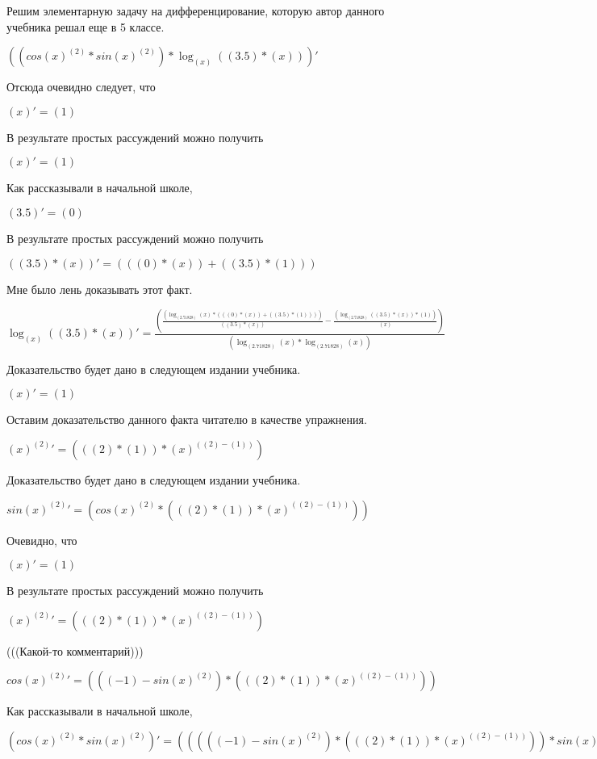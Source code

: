 \documentclass[12pt,a4paper,fleqn]{article}
\theoremstyle{definition}
\begin{document}
Решим элементарную задачу на дифференцирование, которую автор данного учебника решал еще в 5 классе.


$((cos{( x )}^{( 2 )} * sin{( x )}^{( 2 )}) * \log_{( x )}{(( 3.5 ) * ( x ))})'$

Отсюда очевидно следует, что

$( x )' = ( 1 )$

В результате простых рассуждений можно получить

$( x )' = ( 1 )$

Как рассказывали в начальной школе,

$( 3.5 )' = ( 0 )$

В результате простых рассуждений можно получить

$(( 3.5 ) * ( x ))' = ((( 0 ) * ( x )) + (( 3.5 ) * ( 1 )))$

Мне было лень доказывать этот факт.

$\log_{( x )}{(( 3.5 ) * ( x ))}' = \frac{(\frac{(\log_{( 2.71828 )}{( x )} * ((( 0 ) * ( x )) + (( 3.5 ) * ( 1 ))))}{(( 3.5 ) * ( x ))}
 - \frac{(\log_{( 2.71828 )}{(( 3.5 ) * ( x ))} * ( 1 ))}{( x )}
)}{(\log_{( 2.71828 )}{( x )} * \log_{( 2.71828 )}{( x )})}
$

Доказательство будет дано в следующем издании учебника.

$( x )' = ( 1 )$

Оставим доказательство данного факта читателю в качестве упражнения.

${( x )}^{( 2 )}' = ((( 2 ) * ( 1 )) * {( x )}^{(( 2 ) - ( 1 ))})$

Доказательство будет дано в следующем издании учебника.

$sin{( x )}^{( 2 )}' = (cos{( x )}^{( 2 )} * ((( 2 ) * ( 1 )) * {( x )}^{(( 2 ) - ( 1 ))}))$

Очевидно, что

$( x )' = ( 1 )$

В результате простых рассуждений можно получить

${( x )}^{( 2 )}' = ((( 2 ) * ( 1 )) * {( x )}^{(( 2 ) - ( 1 ))})$

(((Какой-то комментарий)))

$cos{( x )}^{( 2 )}' = ((( -1 ) - sin{( x )}^{( 2 )}) * ((( 2 ) * ( 1 )) * {( x )}^{(( 2 ) - ( 1 ))}))$

Как рассказывали в начальной школе,

$(cos{( x )}^{( 2 )} * sin{( x )}^{( 2 )})' = ((((( -1 ) - sin{( x )}^{( 2 )}) * ((( 2 ) * ( 1 )) * {( x )}^{(( 2 ) - ( 1 ))})) * sin{( x )}^{( 2 )}) + (cos{( x )}^{( 2 )} * (cos{( x )}^{( 2 )} * ((( 2 ) * ( 1 )) * {( x )}^{(( 2 ) - ( 1 ))}))))$
\end{document}
